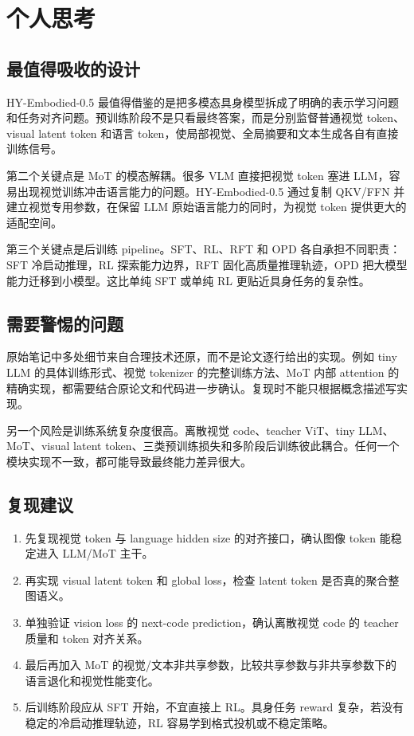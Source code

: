 \section{个人思考}

\subsection{最值得吸收的设计}

HY-Embodied-0.5 最值得借鉴的是把多模态具身模型拆成了明确的表示学习问题和任务对齐问题。预训练阶段不是只看最终答案，而是分别监督普通视觉 token、visual latent token 和语言 token，使局部视觉、全局摘要和文本生成各自有直接训练信号。

第二个关键点是 MoT 的模态解耦。很多 VLM 直接把视觉 token 塞进 LLM，容易出现视觉训练冲击语言能力的问题。HY-Embodied-0.5 通过复制 QKV/FFN 并建立视觉专用参数，在保留 LLM 原始语言能力的同时，为视觉 token 提供更大的适配空间。

第三个关键点是后训练 pipeline。SFT、RL、RFT 和 OPD 各自承担不同职责：SFT 冷启动推理，RL 探索能力边界，RFT 固化高质量推理轨迹，OPD 把大模型能力迁移到小模型。这比单纯 SFT 或单纯 RL 更贴近具身任务的复杂性。

\subsection{需要警惕的问题}

原始笔记中多处细节来自合理技术还原，而不是论文逐行给出的实现。例如 tiny LLM 的具体训练形式、视觉 tokenizer 的完整训练方法、MoT 内部 attention 的精确实现，都需要结合原论文和代码进一步确认。复现时不能只根据概念描述写实现。

另一个风险是训练系统复杂度很高。离散视觉 code、teacher ViT、tiny LLM、MoT、visual latent token、三类预训练损失和多阶段后训练彼此耦合。任何一个模块实现不一致，都可能导致最终能力差异很大。

\subsection{复现建议}

\begin{enumerate}
    \item 先复现视觉 token 与 language hidden size 的对齐接口，确认图像 token 能稳定进入 LLM/MoT 主干。
    \item 再实现 visual latent token 和 global loss，检查 latent token 是否真的聚合整图语义。
    \item 单独验证 vision loss 的 next-code prediction，确认离散视觉 code 的 teacher 质量和 token 对齐关系。
    \item 最后再加入 MoT 的视觉/文本非共享参数，比较共享参数与非共享参数下的语言退化和视觉性能变化。
    \item 后训练阶段应从 SFT 开始，不宜直接上 RL。具身任务 reward 复杂，若没有稳定的冷启动推理轨迹，RL 容易学到格式投机或不稳定策略。
\end{enumerate}

